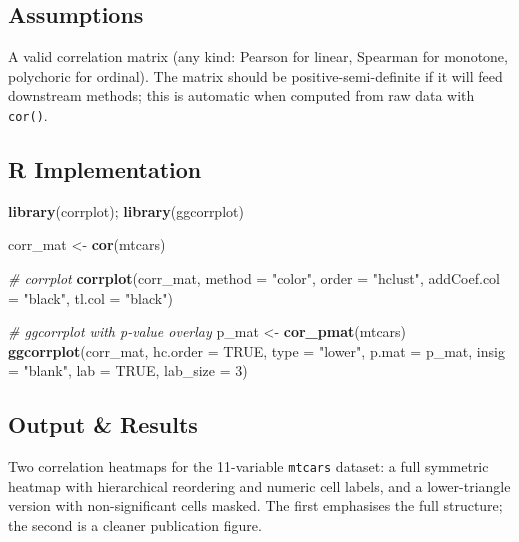 \documentclass[
]{article}
\newenvironment{Shaded}{\begin{snugshade}}{\end{snugshade}}
\newcommand{\AttributeTok}[1]{\textcolor[rgb]{0.13,0.29,0.53}{#1}}
\newcommand{\CommentTok}[1]{\textcolor[rgb]{0.56,0.35,0.01}{\textit{#1}}}
\newcommand{\ConstantTok}[1]{\textcolor[rgb]{0.56,0.35,0.01}{#1}}
\newcommand{\DecValTok}[1]{\textcolor[rgb]{0.00,0.00,0.81}{#1}}
\newcommand{\FunctionTok}[1]{\textcolor[rgb]{0.13,0.29,0.53}{\textbf{#1}}}
\newcommand{\NormalTok}[1]{#1}
\newcommand{\OtherTok}[1]{\textcolor[rgb]{0.56,0.35,0.01}{#1}}
\newcommand{\StringTok}[1]{\textcolor[rgb]{0.31,0.60,0.02}{#1}}
\begin{document}
\subsection{Assumptions}\label{assumptions}

A valid correlation matrix (any kind: Pearson for linear, Spearman for
monotone, polychoric for ordinal). The matrix should be
positive-semi-definite if it will feed downstream methods; this is
automatic when computed from raw data with \texttt{cor()}.

\subsection{R Implementation}\label{r-implementation}

\begin{Shaded}
\begin{Highlighting}[]
\FunctionTok{library}\NormalTok{(corrplot); }\FunctionTok{library}\NormalTok{(ggcorrplot)}

\NormalTok{corr\_mat }\OtherTok{\textless{}{-}} \FunctionTok{cor}\NormalTok{(mtcars)}

\CommentTok{\# corrplot}
\FunctionTok{corrplot}\NormalTok{(corr\_mat, }\AttributeTok{method =} \StringTok{"color"}\NormalTok{, }\AttributeTok{order =} \StringTok{"hclust"}\NormalTok{,}
         \AttributeTok{addCoef.col =} \StringTok{"black"}\NormalTok{, }\AttributeTok{tl.col =} \StringTok{"black"}\NormalTok{)}

\CommentTok{\# ggcorrplot with p{-}value overlay}
\NormalTok{p\_mat }\OtherTok{\textless{}{-}} \FunctionTok{cor\_pmat}\NormalTok{(mtcars)}
\FunctionTok{ggcorrplot}\NormalTok{(corr\_mat, }\AttributeTok{hc.order =} \ConstantTok{TRUE}\NormalTok{, }\AttributeTok{type =} \StringTok{"lower"}\NormalTok{,}
           \AttributeTok{p.mat =}\NormalTok{ p\_mat, }\AttributeTok{insig =} \StringTok{"blank"}\NormalTok{,}
           \AttributeTok{lab =} \ConstantTok{TRUE}\NormalTok{, }\AttributeTok{lab\_size =} \DecValTok{3}\NormalTok{)}
\end{Highlighting}
\end{Shaded}

\subsection{Output \& Results}\label{output-results}

Two correlation heatmaps for the 11-variable \texttt{mtcars} dataset: a
full symmetric heatmap with hierarchical reordering and numeric cell
labels, and a lower-triangle version with non-significant cells masked.
The first emphasises the full structure; the second is a cleaner
publication figure.
\end{document}
